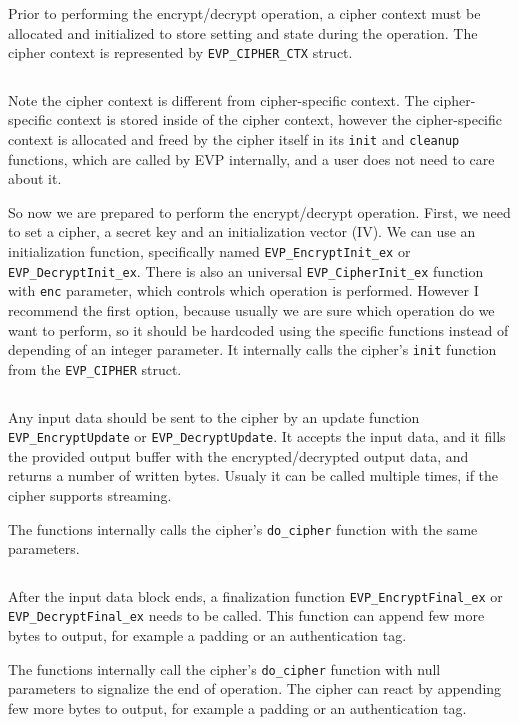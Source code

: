 Prior to performing the encrypt/decrypt operation, a cipher context must be allocated and initialized to store setting and state during the operation. The cipher context is represented by \texttt{EVP\_CIPHER\_CTX} struct.

\inputminted{c}{code/openssl-evp-cipher-ctx-new.c}

Note the cipher context is different from cipher-specific context. The cipher-specific context is stored inside of the cipher context, however the cipher-specific context is allocated and freed by the cipher itself in its \texttt{init} and \texttt{cleanup} functions, which are called by EVP internally, and a user does not need to care about it.

So now we are prepared to perform the encrypt/decrypt operation. First, we need to set a cipher, a secret key and an initialization vector (IV). We can use an initialization function, specifically named \texttt{EVP\_EncryptInit\_ex} or \texttt{EVP\_DecryptInit\_ex}. There is also an universal \texttt{EVP\_CipherInit\_ex} function with \texttt{enc} parameter, which controls which operation is performed. However I recommend the first option, because usually we are sure which operation do we want to perform, so it should be hardcoded using the specific functions instead of depending of an integer parameter. It internally calls the cipher's \texttt{init} function from the \texttt{EVP\_CIPHER} struct.

\inputminted{c}{code/openssl-evp-cipherinit.c}

Any input data should be sent to the cipher by an update function \texttt{EVP\_EncryptUpdate} or \texttt{EVP\_DecryptUpdate}. It accepts the input data, and it fills the provided output buffer with the encrypted/decrypted output data, and returns a number of written bytes. Usualy it can be called multiple times, if the cipher supports streaming.

The functions internally calls the cipher's \texttt{do\_cipher} function with the same parameters.

\inputminted{c}{code/openssl-evp-cipherupdate.c}

After the input data block ends, a finalization function \texttt{EVP\_EncryptFinal\_ex} or \texttt{EVP\_DecryptFinal\_ex} needs to be called. This function can append few more bytes to output, for example a padding or an authentication tag.

The functions internally call the cipher's \texttt{do\_cipher} function with null parameters to signalize the end of operation. The cipher can react by appending few more bytes to output, for example a padding or an authentication tag.

